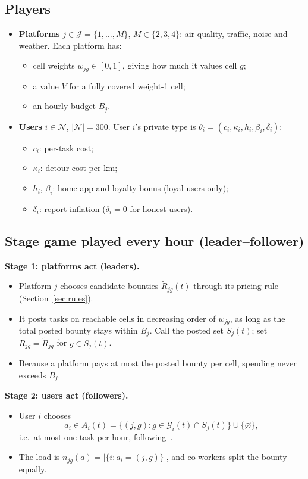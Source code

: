 \documentclass[12pt,draftcls,onecolumn]{IEEEtran}
\begin{document}
\subsection{Players}
\begin{itemize}
\item \textbf{Platforms} $j\in\mathcal J=\{1,\dots,M\}$, $M\in\{2,3,4\}$: air quality, traffic, noise and weather. Each platform has:
  \begin{itemize}
  \item cell weights $w_{jg}\in[0,1]$, giving how much it values cell $g$;
  \item a value $V$ for a fully covered weight-1 cell;
  \item an hourly budget $B_j$.
  \end{itemize}
\item \textbf{Users} $i\in\mathcal N$, $|\mathcal N|=300$. User $i$'s private type is $\theta_i=(c_i,\kappa_i,h_i,\beta_i,\delta_i)$:
  \begin{itemize}
  \item $c_i$: per-task cost;
  \item $\kappa_i$: detour cost per km;
  \item $h_i$, $\beta_i$: home app and loyalty bonus (loyal users only);
  \item $\delta_i$: report inflation ($\delta_i=0$ for honest users).
  \end{itemize}
\end{itemize}

\subsection{Stage game played every hour (leader--follower)}
\textbf{Stage 1: platforms act (leaders).}
\begin{itemize}
\item Platform $j$ chooses candidate bounties $\tilde R_{jg}(t)$ through its pricing rule (Section~\ref{sec:rules}).
\item It posts tasks on reachable cells in decreasing order of $w_{jg}$, as long as the total posted bounty stays within $B_j$. Call the posted set $S_j(t)$; set $R_{jg}=\tilde R_{jg}$ for $g\in S_j(t)$.
\item Because a platform pays at most the posted bounty per cell, spending never exceeds $B_j$.
\end{itemize}

\textbf{Stage 2: users act (followers).}
\begin{itemize}
\item User $i$ chooses
\[a_i\in A_i(t)=\{(j,g): g\in\mathcal G_i(t)\cap S_j(t)\}\cup\{\varnothing\},\]
i.e.\ at most one task per hour, following~\cite{dongare2026pacmab}.
\item The load is $n_{jg}(a)=|\{i:a_i=(j,g)\}|$, and co-workers split the bounty equally.
\end{itemize}
\end{document}
